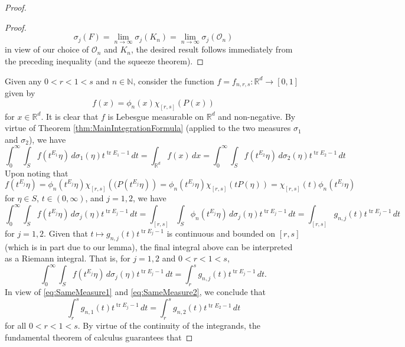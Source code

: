 \documentclass[11pt]{article}
\theoremstyle{theorem}
\newcommand*{\myproofname}{Proof}
\newenvironment{subproof}[1][\myproofname]{\begin{proof}[#1]\renewcommand*{\qedsymbol}{$\mathbin{/\mkern-6mu/}$}}{\end{proof}}
\newcommand\tr{\operatorname{tr}}
\begin{document}
\begin{proof}
\begin{subproof}
\begin{equation*}
\sigma_j(F)=\lim_{n\to\infty}\sigma_j(K_n)=\lim_{n\to\infty}\sigma_j(\mathcal{O}_n)
\end{equation*}
in view of our choice of $\mathcal{O}_n$ and $K_n$, the desired result follows immediately from the preceding inequality (and the squeeze theorem).
\end{subproof}
\noindent Given any $0<r<1< s$ and $n\in\mathbb{N}$, consider the function $f=f_{n,r,s}:\mathbb{R}^d\to [0,1]$ given by
\begin{equation*}
f(x)=\phi_n(x)\chi_{[r,s]}(P(x))
\end{equation*}
for $x\in\mathbb{R}^d$. It is clear that $f$ is Lebesgue measurable on $\mathbb{R}^d$ and non-negative. By virtue of Theorem \ref{thm:MainIntegrationFormula} (applied to the two measures $\sigma_1$ and $\sigma_2$), we have
\begin{equation}\label{eq:SameMeasure1}
\int_0^\infty \int_Sf(t^{E_1}\eta)\,d\sigma_1(\eta)t^{\tr E_1-1}\,dt=\int_{\mathbb{R}^d}f(x)\,dx=\int_0^\infty \int_Sf(t^{E_2}\eta)\,d\sigma_2(\eta)t^{\tr E_2-1}\,dt
\end{equation}
Upon noting that
\begin{equation*}
f(t^{E_j}\eta)=\phi_n(t^{E_j}\eta)\chi_{[r,s]}\left((P(t^{E_j}\eta)\right)=\phi_n(t^{E_j}\eta)\chi_{[r,s]}(tP(\eta))=\chi_{[r,s]}(t)\phi_n(t^{E_j}\eta)
\end{equation*}
for $\eta\in S$, $t\in (0,\infty)$, and $j=1,2$, we have
\begin{equation*}
\int_0^\infty\int_S f(t^{E_j}\eta)\,d\sigma_j(\eta)t^{\tr E_j-1}\,dt=\int_{[r,s]}\int_S\phi_n(t^{E_j}\eta)\,d\sigma_j(\eta) t^{\tr E_j-1}\,dt=\int_{[r,s]}g_{n,j}(t)t^{\tr E_j-1}\,dt
\end{equation*}
for $j=1,2$. Given that $t\mapsto g_{n,j}(t)t^{\tr E_j-1}$ is continuous and bounded on $[r,s]$ (which is in part due to our lemma), the final integral above can be interpreted as a Riemann integral. That is, for $j=1,2$ and $0<r<1<s$,
\begin{equation}\label{eq:SameMeasure2}
\int_0^\infty \int_S f(t^{E_j}\eta)\,d\sigma_j(\eta)t^{\tr E_j-1}\,dt=\int_r^sg_{n,j}(t)t^{\tr E_j-1}\,dt.
\end{equation}
In view of \eqref{eq:SameMeasure1} and \eqref{eq:SameMeasure2}, we conclude that
\begin{equation*}
\int_r^s g_{n,1}(t)t^{\tr E_j-1}\,dt=\int_r^s g_{n,2}(t)t^{\tr E_2-1}\,dt
\end{equation*}
for all $0<r<1<s$. By virtue of the continuity of the integrands, the fundamental theorem of calculus guarantees that

\end{proof}
\end{document}
